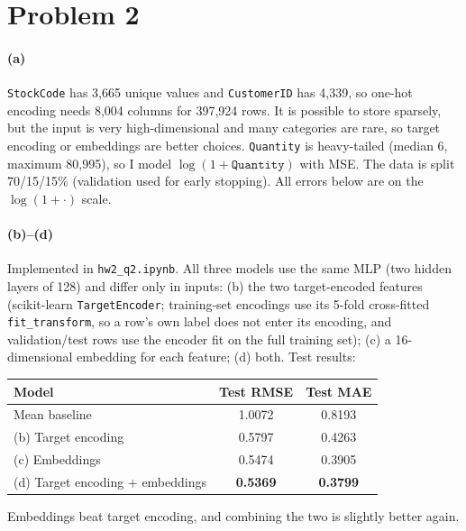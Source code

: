 \documentclass[11pt]{article}
\begin{document}
\section*{Problem 2}

\paragraph{(a)}
\texttt{StockCode} has 3{,}665 unique values and \texttt{CustomerID} has 4{,}339, so one-hot encoding needs 8{,}004 columns for 397{,}924 rows. It is possible to store sparsely, but the input is very high-dimensional and many categories are rare, so target encoding or embeddings are better choices. \texttt{Quantity} is heavy-tailed (median 6, maximum 80{,}995), so I model $\log(1+\texttt{Quantity})$ with MSE. The data is split 70/15/15\% (validation used for early stopping). All errors below are on the $\log(1+\cdot)$ scale.

\paragraph{(b)--(d)}
Implemented in \texttt{hw2\_q2.ipynb}. All three models use the same MLP (two hidden layers of 128) and differ only in inputs: (b) the two target-encoded features (scikit-learn \texttt{TargetEncoder}; training-set encodings use its 5-fold cross-fitted \texttt{fit\_transform}, so a row's own label does not enter its encoding, and validation/test rows use the encoder fit on the full training set); (c) a 16-dimensional embedding for each feature; (d) both. Test results:

\begin{table}[H]
\centering
\begin{tabular}{lcc}
\toprule
Model & Test RMSE & Test MAE \\
\midrule
Mean baseline & 1.0072 & 0.8193 \\
(b) Target encoding & 0.5797 & 0.4263 \\
(c) Embeddings & 0.5474 & 0.3905 \\
(d) Target encoding + embeddings & \textbf{0.5369} & \textbf{0.3799} \\
\bottomrule
\end{tabular}
\end{table}
Embeddings beat target encoding, and combining the two is slightly better again.
\end{document}
